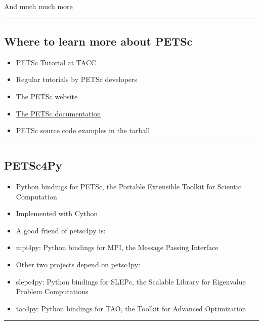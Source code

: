 \documentclass{article}
\begin{document}
And much much more

    \begin{center}\rule{3in}{0.4pt}\end{center}

\subsection{Where to learn more about
PETSc}\label{where-to-learn-more-about-petsc}

\begin{itemize}
\itemsep1pt\parskip0pt
\item
  PETSc Tutorial at TACC
\item
  Regular tutorials by PETSc developers
\item
  \href{http://www.mcs.anl.gov/petsc/}{The PETSc website}
\item
  \href{http://www.mcs.anl.gov/petsc/documentation/index.html}{The PETSc
  documentation}
\item
  PETSc source code examples in the tarball
\end{itemize}

    \begin{center}\rule{3in}{0.4pt}\end{center}

\subsection{PETSc4Py}\label{petsc4py}

\begin{itemize}
\itemsep1pt\parskip0pt
\item
  Python bindings for PETSc, the Portable Extensible Toolkit for
  Scientic Computation
\item
  Implemented with Cython
\item
  A good friend of petsc4py is:
\item
  mpi4py: Python bindings for MPI, the Message Passing Interface
\item
  Other two projects depend on petsc4py:
\item
  slepc4py: Python bindings for SLEPc, the Scalable Library for
  Eigenvalue Problem Computations
\item
  tao4py: Python bindings for TAO, the Toolkit for Advanced Optimization
\end{itemize}

    \begin{center}\rule{3in}{0.4pt}\end{center}
\end{document}
